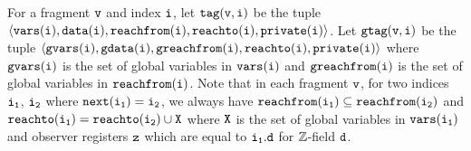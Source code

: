 For a fragment $\tt v$ and index $\tt i$, let $\tt tag(v,i)$ be the tuple $\tt \left\langle\tt vars(i), data(i),{\tt reachfrom}(\tt i), {\tt reachto}(\tt i), private(i )\right\rangle$. Let $\tt gtag(v,i)$ be the tuple $\tt \left\langle\tt gvars(i), gdata(i),{\tt greachfrom}(\tt i), {\tt reachto}(\tt i), private(i )\right\rangle$ where $\tt gvars(i)$ is the set of global variables in $\tt vars(i)$ and $\tt greachfrom(i)$ is the set of global variables in $\tt reachfrom(i)$. Note that in each fragment $\tt v$, for two indices $\tt i_1$, $\tt i_2$ where $\tt next(i_1) = i_2$, we always have $\tt {\tt reachfrom}(\tt i_1) \subseteq \tt {\tt reachfrom}(\tt i_2)$ and $\tt {\tt reachto}(\tt i_1) = \tt {\tt reachto}(\tt i_2) \cup X$ where $\tt X$ is the set of global variables in ${\tt vars}(\tt i_1)$ and observer registers $\tt z$ which are equal to $\tt i_1.d$ for ${\mathbb Z}$-field $\tt d$. 
%

